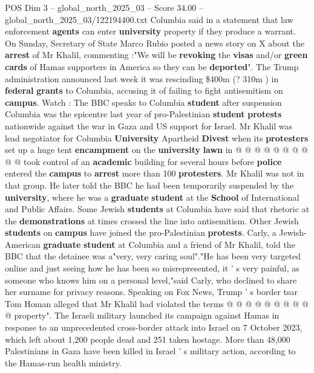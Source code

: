 \begin{textsample}{POS Dim 3 – global\_north\_2025\_03 – Score 34.00 – global\_north\_2025\_03/122194400.txt}
Columbia said in a statement that law enforcement \textbf{agents} can enter \textbf{university} property if they produce a warrant.
On Sunday, Secretary of State Marco Rubio posted a news story on X about the \textbf{arrest} of Mr Khalil, commenting :"We will be \textbf{revoking} the \textbf{visas} and/or \textbf{green} \textbf{cards} of Hamas supporters in America so they can be \textbf{deported}".
The Trump administration announced last week it was rescinding \$400m (? 310m ) in \textbf{federal} \textbf{grants} to Columbia, accusing it of failing to fight antisemitism on \textbf{campus}.
Watch : The BBC speaks to Columbia \textbf{student} after suspension Columbia was the epicentre last year of pro-Palestinian \textbf{student} \textbf{protests} nationwide against the war in Gaza and US support for Israel.
Mr Khalil was lead negotiator for Columbia \textbf{University} Apartheid \textbf{Divest} when its \textbf{protesters} set up a huge tent \textbf{encampment} on the \textbf{university} \textbf{lawn} in @ @ @ @ @ @ @ @ @ @ took control of an \textbf{academic} building for several hours before \textbf{police} entered the \textbf{campus} to \textbf{arrest} more than 100 \textbf{protesters}.
Mr Khalil was not in that group.
He later told the BBC he had been temporarily suspended by the \textbf{university}, where he was a \textbf{graduate} \textbf{student} at the \textbf{School} of International and Public Affairs.
Some Jewish \textbf{students} at Columbia have said that rhetoric at the \textbf{demonstrations} at times crossed the line into antisemitism.
Other Jewish \textbf{students} on \textbf{campus} have joined the pro-Palestinian \textbf{protests}.
Carly, a Jewish-American \textbf{graduate} \textbf{student} at Columbia and a friend of Mr Khalil, told the BBC that the detainee was a"very, very caring soul"."He has been very targeted online and just seeing how he has been so misrepresented, it ' s very painful, as someone who knows him on a personal level,"said Carly, who declined to share her surname for privacy reasons.
Speaking on Fox News, Trump ' s border tsar Tom Homan alleged that Mr Khalil had violated the terms @ @ @ @ @ @ @ @ @ @ property".
The Israeli military launched its campaign against Hamas in response to an unprecedented cross-border attack into Israel on 7 October 2023, which left about 1,200 people dead and 251 taken hostage.
More than 48,000 Palestinians in Gaza have been killed in Israel ' s military action, according to the Hamas-run health ministry.

\end{textsample}
